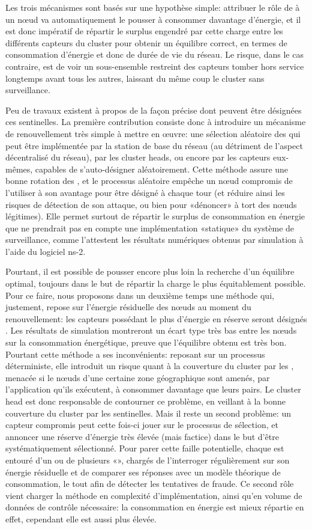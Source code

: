 Les trois mécanismes sont basés sur une hypothèse simple: attribuer le rôle de \cnt à un nœud va automatiquement le pousser à consommer davantage d'énergie, et il est donc impératif de répartir le surplus engendré par cette charge entre les différents capteurs du cluster pour obtenir un équilibre correct, en termes de consommation d'énergie et donc de durée de vie du réseau.
Le risque, dans le cas contraire, est de voir un sous-ensemble restreint des capteurs tomber hors service longtemps avant tous les autres, laissant du même coup le cluster sans surveillance.

Peu de travaux existent à propos de la façon précise dont peuvent être désignées ces sentinelles.
La première contribution consiste donc à introduire un mécanisme de renouvellement très simple à mettre en œuvre: une sélection aléatoire des \cnst qui peut être implémentée par la station de base du réseau (au détriment de l'aspect décentralisé du réseau), par les cluster heads, ou encore par les capteurs eux-mêmes, capables de s'auto-désigner aléatoirement.
Cette méthode assure une bonne rotation des \cnst, et le processus aléatoire empêche un nœud compromis de l'utiliser à son avantage pour être désigné à chaque tour (et réduire ainsi les risques de détection de son attaque, ou bien pour «dénoncer» à tort des nœuds légitimes).
Elle permet surtout de répartir le surplus de consommation en énergie que ne prendrait pas en compte une implémentation «statique» du système de surveillance, comme l'attestent les résultats numériques obtenus par simulation à l'aide du logiciel \textsf{ns-2}.

Pourtant, il est possible de pousser encore plus loin la recherche d'un équilibre optimal, toujours dans le but de répartir la charge le plus équitablement possible.
Pour ce faire, nous proposons dans un deuxième temps une méthode qui, justement, repose sur l'énergie résiduelle des nœuds au moment du renouvellement: les capteurs possédant le plus d'énergie en réserve seront désignés \cnst.
Les résultats de simulation montreront un écart type très bas entre les nœuds sur la consommation énergétique, preuve que l'équilibre obtenu est très bon.
Pourtant cette méthode a ses inconvénients: reposant sur un processus déterministe, elle introduit un risque quant à la couverture du cluster par les \cnst, menacée si le nœuds d'une certaine zone géographique sont amenés, par l'application qu'ils exécutent, à consommer davantage que leurs pairs.
Le cluster head est donc responsable de contourner ce problème, en veillant à la bonne couverture du cluster par les sentinelles.
Mais il reste un second problème: un capteur compromis peut cette fois-ci jouer sur le processus de sélection, et annoncer une réserve d'énergie très élevée (mais factice) dans le but d'être systématiquement sélectionné.
Pour parer cette faille potentielle, chaque \cnt est entouré d'un ou de plusieurs «\vnst», chargés de l'interroger régulièrement sur son énergie résiduelle et de comparer ses réponses avec un modèle théorique de consommation, le tout afin de détecter les tentatives de fraude.
Ce second rôle vient charger la méthode en complexité d'implémentation, ainsi qu'en volume de données de contrôle nécessaire: la consommation en énergie est mieux répartie en effet, cependant elle est aussi plus élevée.

